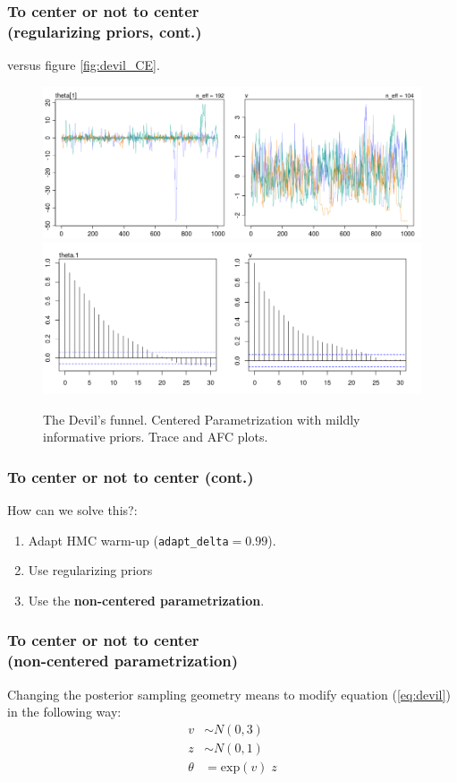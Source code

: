 \documentclass[arial,12pt,xcolor=dvipsnames]{beamer}
\begin{document}
\begin{frame}
	\frametitle{To center or not to center \\
		(regularizing priors, cont.)}
	versus figure \ref{fig:devil_CE}.
	\begin{figure}[h] 
		\centering
			\includegraphics[width=.60\linewidth]{2_trace_CE_priors}
			\includegraphics[width=.63\linewidth]{2_acf_CE_priors}
		\caption{The Devil's funnel. Centered Parametrization with mildly informative priors. Trace and AFC plots.}
		\label{fig:devil_prior}
	\end{figure}
\end{frame}
%
\begin{frame}
	\frametitle{To center or not to center (cont.)}
	How can we solve this?:
	\begin{enumerate}
		\item Adapt HMC warm-up (\texttt{adapt\_delta}$=0.99$).
		\item Use regularizing priors
		\item Use the \textbf{non-centered parametrization}.
	\end{enumerate}
\end{frame}
%
\begin{frame}
	\frametitle{To center or not to center \\
		(non-centered parametrization)}
	Changing the posterior sampling geometry means to modify equation (\ref{eq:devil}) in the following way:
	\begin{equation} \label{eq:devil_NC}
		\begin{split}	
			v &\sim N(0, 3) \\
			z &\sim N(0, 1) \\
			\theta &= \text{exp}(v) \; z
		\end{split}
	\end{equation}
\end{frame}
\end{document}
